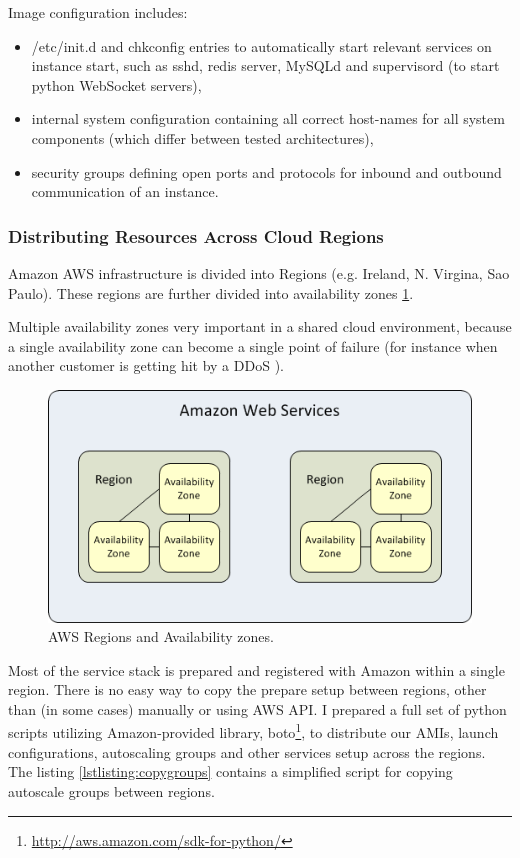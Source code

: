 \documentclass{uvamscse}
\begin{document}
Image configuration includes:
\begin{itemize}
  \item /etc/init.d and chkconfig entries to automatically start relevant services on instance start, such as sshd, redis server, MySQLd and supervisord (to start python WebSocket servers),
  \item internal system configuration containing all correct host-names for all system components (which differ between tested architectures),
  \item security groups defining open ports and protocols for inbound and outbound communication of an instance.
\end{itemize}

\subsubsection{Distributing Resources Across Cloud Regions}

Amazon AWS infrastructure is divided into Regions (e.g. Ireland, N. Virgina, Sao Paulo). These regions are further divided into availability zones \ref{figure:awsregions}.


Multiple availability zones very important in a shared cloud environment, because a single availability zone can become a single point of failure (for instance when another customer is getting hit by a DDoS \cite{GroBuy}).


\begin{figure}[H]
\centering
\includegraphics[scale=0.8]{awsregions}
\caption{AWS Regions and Availability zones.}
\label{figure:awsregions}
\end{figure}

Most of the service stack is prepared and registered with Amazon within a single region. There is no easy way to copy the prepare setup between regions, other than (in some cases) manually or using AWS API. I prepared a full set of python scripts utilizing Amazon-provided library, boto\footnote{\url{http://aws.amazon.com/sdk-for-python/}}, to distribute our AMIs, launch configurations, autoscaling groups and other services setup across the regions. The listing \ref{lstlisting:copygroups} contains a simplified script for copying autoscale groups between regions.
\end{document}
